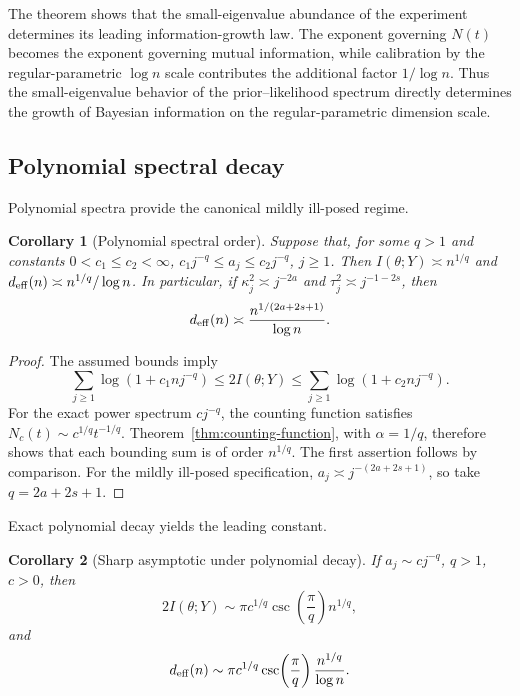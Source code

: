 \documentclass[11pt]{article}
\theoremstyle{plain}
\newtheorem{corollary}{Corollary}
\theoremstyle{definition}
\theoremstyle{remark}
\begin{document}
The theorem shows that the small-eigenvalue abundance of the experiment determines its leading information-growth law. The exponent governing \(N(t)\) becomes the exponent governing mutual information, while calibration by the regular-parametric \(\log n\) scale contributes the additional factor \(1/\log n\). Thus the small-eigenvalue behavior of the prior--likelihood spectrum directly determines the growth of Bayesian information on the regular-parametric dimension scale.


\subsection{Polynomial spectral decay}
\label{subsec:polynomial-spectrum}

Polynomial spectra provide the canonical mildly ill-posed regime.

\begin{corollary}[Polynomial spectral order]
	\label{cor:sequence-growth}
	Suppose that, for some \(q>1\) and constants \(0<c_1\leq c_2<\infty\), \(c_1j^{-q}\leq a_j\leq c_2j^{-q}\), \(j\geq1\). Then \(I(\theta;Y)\asymp n^{1/q}\) and \(d_{\rm eff}(n)\asymp n^{1/q}/\log n\). In particular, if \(\kappa_j^2\asymp j^{-2a}\) and \(\tau_j^2\asymp j^{-1-2s}\), then
	\[
	d_{\rm eff}(n)\asymp\frac{n^{1/(2a+2s+1)}}{\log n}.
	\]
\end{corollary}

\begin{proof}
	The assumed bounds imply
	\[
	\sum_{j\geq1}\log(1+c_1nj^{-q})
	\leq
	2I(\theta;Y)
	\leq
	\sum_{j\geq1}\log(1+c_2nj^{-q}).
	\]
	For the exact power spectrum \(cj^{-q}\), the counting function satisfies \(N_c(t)\sim c^{1/q}t^{-1/q}\). Theorem~\ref{thm:counting-function}, with \(\alpha=1/q\), therefore shows that each bounding sum is of order \(n^{1/q}\). The first assertion follows by comparison. For the mildly ill-posed specification, \(a_j\asymp j^{-(2a+2s+1)}\), so take \(q=2a+2s+1\).
\end{proof}

Exact polynomial decay yields the leading constant.

\begin{corollary}[Sharp asymptotic under polynomial decay]
	\label{cor:sequence-sharp}
	If \(a_j\sim cj^{-q}\), \(q>1\), \(c>0\), then
	\[
	2I(\theta;Y)
	\sim
	\pi c^{1/q}\csc\!\left(\frac{\pi}{q}\right)n^{1/q},
	\]
	and
	\[
	d_{\rm eff}(n)
	\sim
	\pi c^{1/q}\csc\!\left(\frac{\pi}{q}\right)
	\frac{n^{1/q}}{\log n}.
	\]
\end{corollary}
\end{document}
